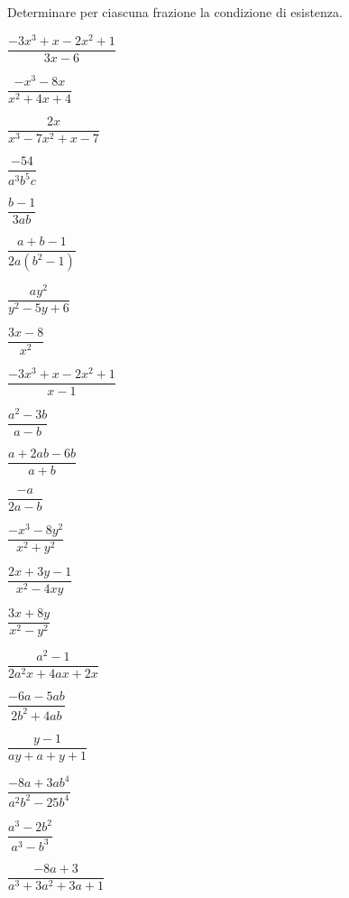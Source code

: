 \begin{esercizio}
\label{ese:19.1}
Determinare per ciascuna frazione la condizione di esistenza.
\begin{multicols}{3}
\begin{enumeratea}
 \item \(\dfrac{-3x^{3}+x-2x^{2}+1}{3x-6}\)
 \item \(\dfrac{-x^{3}-8x}{x^{2}+4x+4}\)
 \item \(\dfrac{2x}{x^{3}-7x^{2}+x-7}\)
 \item \(\dfrac{-54}{a^{3}b^{5}c}\)
 \item \(\dfrac{b-1}{3ab}\)
 \item \(\dfrac{a+b-1}{2a \left(b^{2}-1\right)}\)
 \item \(\dfrac{ay^{2}}{y^{2}-5y+6}\)
 \item \(\dfrac{3x-8}{x^{2}}\)
 \item \(\dfrac{-3x^{3}+x-2x^{2}+1}{x-1}\)
 \item \(\dfrac{a^{{2}}-3b}{a-b}\)
 \item \(\dfrac{a+2ab-6b}{a+b}\)
 \item \(\dfrac{-a}{2a-b}\)
 \item \(\dfrac{-x^{{3}}-8y^{{2}}}{x^{{2}}+y^{{2}}}\)
 \item \(\dfrac{2x+3y-1}{x^{2}-4xy}\)
 \item \(\dfrac{3x+8y}{x^{2}-y^{2}}\)
 \item \(\dfrac{a^{2}-1}{2a^{2}x+4ax+2x}\)
 \item \(\dfrac{-6a-5ab}{2b^{2}+4ab}\)
 \item \(\dfrac{y-1}{ay+a+y+1}\)
 \item \(\dfrac{-8a+3ab^{4}}{a^{2}b^{2}-25b^{4}}\)
 \item \(\dfrac{a^{3}-2b^{2}}{a^{3}-b^{3}}\)
 \item \(\dfrac{-8a+3}{a^{3}+3a^{2}+3a+1}\)
\end{enumeratea}
\end{multicols}
\end{esercizio}

\subsubsection*{}


